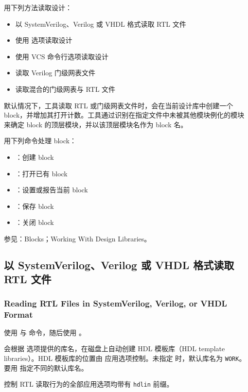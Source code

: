 用下列方法读取设计：
\begin{itemize}
  \item 以 SystemVerilog、Verilog 或 VHDL 格式读取 RTL 文件
  \item 使用  选项读取设计
  \item 使用 VCS 命令行选项读取设计
  \item 读取 Verilog 门级网表文件
  \item 读取混合的门级网表与 RTL 文件
\end{itemize}

默认情况下，工具读取 RTL 或门级网表文件时，会在当前设计库中创建一个 block，并增加其打开计数。工具通过识别在指定文件中未被其他模块例化的模块来确定 block 的顶层模块，并以该顶层模块名作为 block 名。

用下列命令处理 block：
\begin{itemize}
  \item {}：创建 block
  \item {}：打开已有 block
  \item {}：设置或报告当前 block
  \item {}：保存 block
  \item {}：关闭 block
\end{itemize}

\begin{seeAlsoBox}
参见：Blocks；Working With Design Libraries。
\end{seeAlsoBox}

\subsection{以 SystemVerilog、Verilog 或 VHDL 格式读取 RTL 文件}
\subsubsection*{Reading RTL Files in SystemVerilog, Verilog, or VHDL Format}

使用  与  命令，随后使用 。

 会根据  选项提供的库名，在磁盘上自动创建 HDL 模板库（HDL template libraries）。HDL 模板库的位置由  应用选项控制。未指定  时，默认库名为 \texttt{WORK}。要用  指定不同的默认库名。

\begin{noteBox}
控制 RTL 读取行为的全部应用选项均带有 \texttt{hdlin} 前缀。
\end{noteBox}

